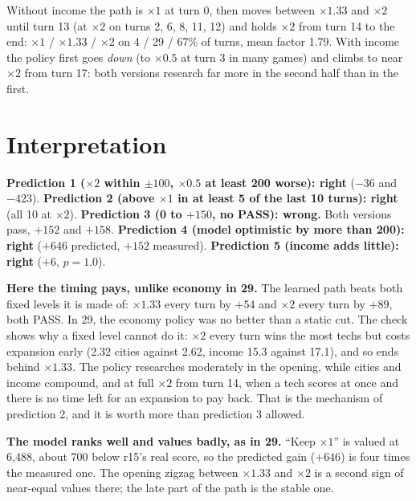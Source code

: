 \documentclass{../polyexp}
\begin{document}
Without income the path is $\times1$ at turn 0, then moves between $\times1.33$ and $\times2$ until turn 13 (at
$\times2$ on turns 2, 6, 8, 11, 12) and holds $\times2$ from turn 14 to the end: $\times1$ / $\times1.33$ / $\times2$
on 4 / 29 / 67\% of turns, mean factor 1.79. With income the policy first goes \emph{down} (to $\times0.5$ at turn 3
in many games) and climbs to near $\times2$ from turn 17: both versions research far more in the second half than
in the first.

\section{Interpretation}
\textbf{Prediction 1 ($\times2$ within $\pm100$, $\times0.5$ at least 200 worse): right} ($-36$ and $-423$).
\textbf{Prediction 2 (above $\times1$ in at least 5 of the last 10 turns): right} (all 10 at $\times2$).
\textbf{Prediction 3 (0 to $+150$, no PASS): wrong.} Both versions pass, $+152$ and $+158$.
\textbf{Prediction 4 (model optimistic by more than 200): right} ($+646$ predicted, $+152$ measured).
\textbf{Prediction 5 (income adds little): right} ($+6$, $p = 1.0$).

\textbf{Here the timing pays, unlike economy in 29.} The learned path beats both fixed levels it is made of:
$\times1.33$ every turn by $+54$ and $\times2$ every turn by $+89$, both PASS. In 29, the economy policy was no better
than a static cut. The check shows why a fixed level cannot do it: $\times2$ every turn wins the most techs but costs
expansion early (2.32 cities against 2.62, income 15.3 against 17.1), and so ends behind $\times1.33$. The policy
researches moderately in the opening, while cities and income compound, and at full $\times2$ from turn 14, when a
tech scores at once and there is no time left for an expansion to pay back. That is the mechanism of prediction 2,
and it is worth more than prediction 3 allowed.

\textbf{The model ranks well and values badly, as in 29.} ``Keep $\times1$'' is valued at 6{,}488, about 700 below
r15's real score, so the predicted gain ($+646$) is four times the measured one. The opening zigzag between
$\times1.33$ and $\times2$ is a second sign of near-equal values there; the late part of the path is the stable one.
\end{document}
